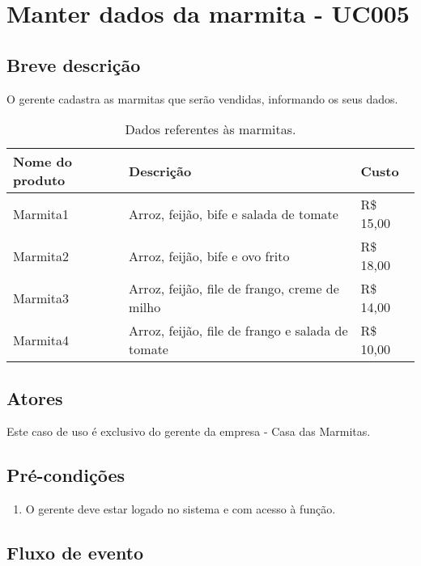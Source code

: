 \chapter{Manter dados da marmita - UC005} \label{uc005}

\section{Breve descrição}

O gerente cadastra as marmitas que serão vendidas, informando os seus dados.

\begin{table}[htb]
	\ABNTEXfontereduzida
	\caption[Dados referentes às marmitas]{Dados referentes às marmitas.}
	\centering
	\label{tab-marmitas}
	\begin{tabular}{|p{4cm}|p{8cm}|p{2cm}|}
		\textbf{Nome do produto} & \textbf{Descrição}                               & \textbf{Custo} \\ \hline
		Marmita1                           & Arroz, feijão, bife e salada de tomate           & R\$ 15,00      \\ \hline
		Marmita2                           & Arroz, feijão, bife e ovo frito                  & R\$ 18,00      \\ \hline
		Marmita3                           & Arroz, feijão, file de frango, creme de milho    & R\$ 14,00      \\ \hline
		Marmita4                           & Arroz, feijão, file de frango e salada de tomate & R\$ 10,00
	\end{tabular}
\end{table}

\section{Atores}

Este caso de uso é exclusivo do gerente da empresa - Casa das Marmitas.

\section{Pré-condições}

\begin{enumerate}
	\item O gerente deve estar logado no sistema e com acesso à função.
\end{enumerate}

\section{Fluxo de evento}

